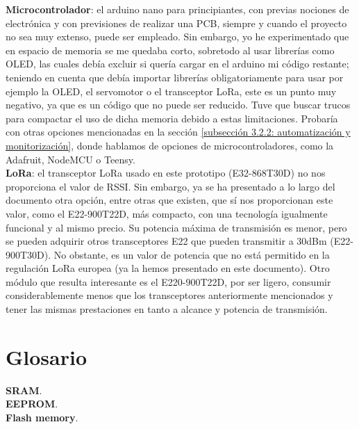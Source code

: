 \documentclass[12pt]{article}
\begin{document}
	\noindent \textbf{Microcontrolador}: el arduino nano para principiantes, con previas nociones de electrónica y con previsiones de realizar una PCB, siempre y cuando el proyecto no sea muy extenso, puede ser empleado. Sin embargo, yo he experimentado que en espacio de memoria se me quedaba corto, sobretodo al usar librerías como OLED, las cuales debía excluir si quería cargar en el arduino mi código restante; teniendo en cuenta que debía importar librerías obligatoriamente para usar por ejemplo la OLED, el servomotor o el transceptor LoRa, este es un punto muy negativo, ya que es un código que no puede ser reducido. Tuve que buscar trucos para compactar el uso de dicha memoria debido a estas limitaciones. Probaría con otras opciones mencionadas en la sección \ref{subsección 3.2.2: automatización y monitorización}, donde hablamos de opciones de microcontroladores, como la Adafruit, NodeMCU o Teensy. \\
	
	\noindent \textbf{LoRa}: el transceptor LoRa usado en este prototipo (E32-868T30D) no nos proporciona el valor de RSSI. Sin embargo, ya se ha presentado a lo largo del documento otra opción, entre otras que existen, que sí nos proporcionan este valor, como el E22-900T22D, más compacto, con una tecnología igualmente funcional y al mismo precio. Su potencia máxima de transmisión es menor, pero se pueden adquirir otros transceptores E22 que pueden transmitir a 30dBm (E22-900T30D). No obstante, es un valor de potencia que no está permitido en la regulación LoRa europea (ya la hemos presentado en este documento). Otro módulo que resulta interesante es el E220-900T22D, por ser ligero, consumir considerablemente menos que los transceptores anteriormente mencionados y tener las mismas prestaciones en tanto a alcance y potencia de transmisión.\\
	
	\pagebreak
	
	\section*{Glosario}
	
	\noindent \textbf{\large SRAM}. \\
	
	\noindent \textbf{\large EEPROM}. \\
	
	\noindent \textbf{\large Flash memory}. \\
	
\end{document}
